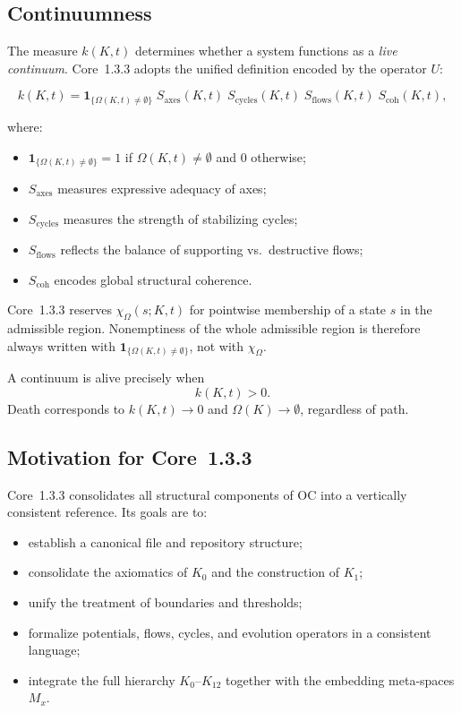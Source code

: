 \subsection{Continuumness}

The measure \(k(K,t)\) determines whether a system functions as a \emph{live continuum}.  
Core~1.3.3 adopts the unified definition encoded by the operator \(U\):

\[
k(K,t) =
\mathbf{1}_{\{\Omega(K,t)\neq\emptyset\}}\;
S_{\mathrm{axes}}(K,t)\;
S_{\mathrm{cycles}}(K,t)\;
S_{\mathrm{flows}}(K,t)\;
S_{\mathrm{coh}}(K,t),
\]

where:

\begin{itemize}
    \item \(\mathbf{1}_{\{\Omega(K,t)\neq\emptyset\}}=1\) if
          \(\Omega(K,t)\neq\emptyset\) and \(0\) otherwise;
    \item \(S_{\mathrm{axes}}\) measures expressive adequacy of axes;
    \item \(S_{\mathrm{cycles}}\) measures the strength of stabilizing cycles;
    \item \(S_{\mathrm{flows}}\) reflects the balance of supporting vs.\ destructive flows;
    \item \(S_{\mathrm{coh}}\) encodes global structural coherence.
\end{itemize}

Core~1.3.3 reserves \(\chi_{\Omega}(s;K,t)\) for pointwise membership of a
state \(s\) in the admissible region. Nonemptiness of the whole admissible
region is therefore always written with
\(\mathbf{1}_{\{\Omega(K,t)\neq\emptyset\}}\), not with \(\chi_{\Omega}\).

A continuum is alive precisely when
\[
k(K,t) > 0.
\]
Death corresponds to \(k(K,t)\to 0\) and \(\Omega(K)\to\emptyset\), regardless of path.

\subsection{Motivation for Core~1.3.3}

Core~1.3.3 consolidates all structural components of OC into a vertically
consistent reference.
Its goals are to:

\begin{itemize}
    \item establish a canonical file and repository structure;
    \item consolidate the axiomatics of \(K_0\) and the construction of \(K_1\);
    \item unify the treatment of boundaries and thresholds;
    \item formalize potentials, flows, cycles, and evolution operators in a consistent language;
    \item integrate the full hierarchy \(K_0\)–\(K_{12}\) together with the embedding meta-spaces \(M_x\).
\end{itemize}


